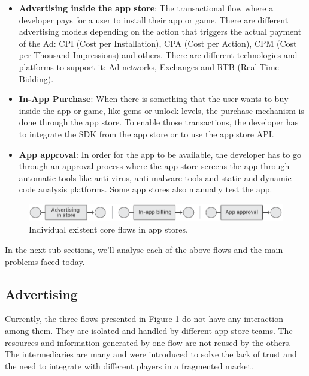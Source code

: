\begin{itemize}
\item {\bf Advertising inside the app store}: The transactional flow where a developer pays for a user to install their app or game. There are different advertising models depending on the action that triggers the actual payment of the Ad: CPI (Cost per Installation), CPA (Cost per Action), CPM (Cost per Thousand Impressions) and others. There are different technologies and platforms to support it: Ad networks, Exchanges and RTB (Real Time Bidding).
\item {\bf In-App Purchase}: When there is something that the user wants to buy inside the app or game, like gems or unlock levels, the purchase mechanism is done through the app store. To enable those transactions, the developer has to integrate the SDK from the app store or to use the app store API.
\item {\bf App approval}: In order for the app to be available, the developer has to go through an approval process where the app store screens the app through automatic tools like anti-virus, anti-malware tools and static and dynamic code analysis platforms. Some app stores also manually test the app.
\end{itemize}


\begin{figure}[!ht]
\centering
\includegraphics[width=\textwidth]{diagrams/current_flows.eps}
\caption{Individual existent core flows in app stores.}
\label{fig:exist_flows}
\end{figure}


In the next sub-sections, we'll analyse each of the above flows and the main problems faced today.

\subsection{Advertising}
\label{subsec:intro_ads}


Currently, the three flows presented in Figure \ref{fig:exist_flows} do not have any interaction among them. They are isolated and handled by different app store teams. The resources and information generated by one flow are not reused by the others. The intermediaries are many and were introduced to solve the lack of trust and the need to integrate with different players in a fragmented market.  

